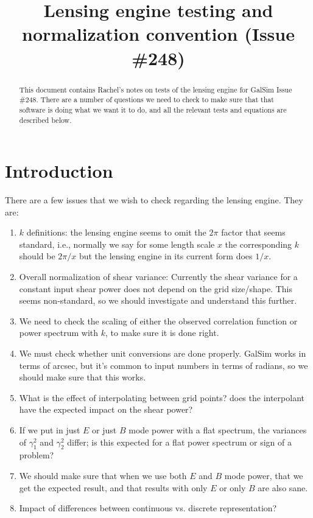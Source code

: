 \documentclass[preprint]{aastex}
\begin{document}
\title{Lensing engine testing and normalization convention (Issue \#248)}

\begin{abstract}
This document contains Rachel's notes on tests of the lensing engine
for GalSim Issue \#248.  There are a number of questions we need to
check to make sure that that software is doing what we want it to do,
and all the relevant tests and equations are described below.
\end{abstract}

\section{Introduction}

There are a few issues that we wish to check regarding the lensing
engine.  They are:

\begin{enumerate}
\item $k$ definitions: the lensing engine seems to omit the $2\pi$
  factor that seems standard, i.e., normally we say for some length
  scale $x$ the corresponding $k$ should be $2\pi/x$ but the lensing
  engine in its current form does $1/x$.
\item Overall normalization of shear variance: Currently the shear
  variance for a constant input shear power does not depend on
  the grid size/shape.  This seems non-standard, so we should
  investigate and understand this further.
\item We need to check the scaling of either the observed correlation
  function or power spectrum with $k$, to make sure it is done right.
\item We must check whether unit conversions are done properly.
  GalSim works in terms of arcsec, but it's common to input numbers in
  terms of radians, so we should make sure that this works.
\item What is the effect of interpolating between grid points?  does
  the interpolant have the expected impact on the shear power?
\item If we put in just $E$ or just $B$ mode power with a flat
  spectrum, the variances of $\gamma_1^2$ and $\gamma_2^2$ differ; is
  this expected for a flat power spectrum or sign of a problem?
\item We should make sure that when we use both $E$ and $B$ mode
  power, that we get the expected result, and that results with only
  $E$ or only $B$ are also sane.
\item Impact of differences between continuous vs. discrete
  representation?
\end{enumerate}
\end{document}
